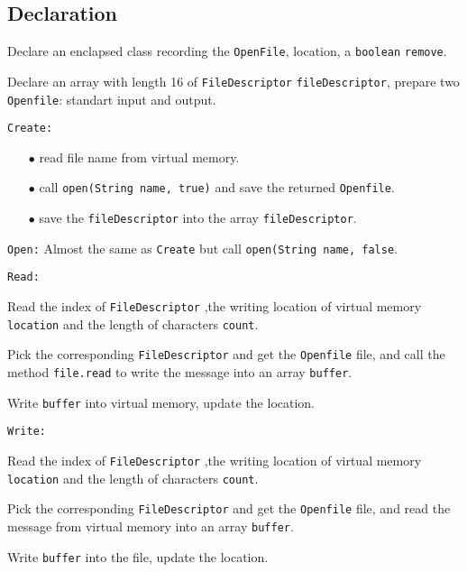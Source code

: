 \documentclass{article}
\begin{document}
\subsection{Declaration}
\begin{compactitem}
\item Declare an enclapsed  class recording the \texttt{OpenFile}, location, a \texttt{boolean} \texttt{remove}.
\item Declare an array with length 16 of \texttt{FileDescriptor} \texttt{fileDescriptor}, prepare two \texttt{Openfile}: standart input and output.
\item \texttt{Create:}
	\begin{enumerate}
		\item[$\bullet$] read file name from virtual memory.
		\item[$\bullet$] call \texttt{open(String name, true)} and save the returned \texttt{Openfile}.
		\item[$\bullet$] save the \texttt{fileDescriptor} into the array \texttt{fileDescriptor}.
	\end{enumerate}
\item \texttt{Open:} Almost the same as \texttt{Create} but call \texttt{open(String name, false}.
\item \texttt{Read:}
	\begin{compactitem}
		\item Read the index of \texttt{FileDescriptor} ,the writing location of virtual memory \texttt{location} and the length of characters \texttt{count}.
		\item Pick the corresponding \texttt{FileDescriptor} and get the \texttt{Openfile} file, and call the method \texttt{file.read} to write the message into an array \texttt{buffer}.
		\item Write \texttt{buffer} into virtual memory, update the location.
	\end{compactitem}
\item \texttt{Write:}
	\begin{compactitem}
		\item Read the index of \texttt{FileDescriptor} ,the writing location of virtual memory \texttt{location} and the length of characters \texttt{count}.
		\item Pick the corresponding \texttt{FileDescriptor} and get the \texttt{Openfile} file, and read the message from virtual memory into an array \texttt{buffer}.
		\item Write \texttt{buffer} into the file, update the location.

\end{compactitem}
\end{compactitem}
\end{document}
